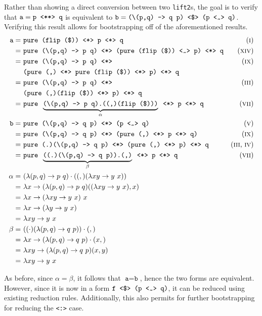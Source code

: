 Rather than showing a direct conversion between two \texttt{lift2}s, the goal is to verify that $\texttt{a} = \texttt{p \pa q}$ is equivalent to $\texttt{b} = \texttt{(\textbackslash (p,q) -> q p) \fmap (p \mult q)}$.
Verifying this result allows for bootstrapping off of the aforementioned results.
\begin{align*}
    \texttt{a} =\ & \texttt{pure (flip (\$)) \ap p \ap q} & \equi[1] \\
    =\ & \texttt{pure (\textbackslash (p,q) -> p q) \ap (pure (flip (\$)) \mult p) \ap q} & \equi[14] \\
    =\ & \texttt{pure (\textbackslash (p,q) -> p q) \ap} & \equi[9] \\
    & \texttt{(pure (,) \ap pure (flip (\$)) \ap p) \ap q}  \\
    =\ & \texttt{pure (\textbackslash (p,q) -> p q) \ap} & \equi[3] \\
    & \texttt{(pure (,)(flip (\$)) \ap p) \ap q} \\
    =\ & \texttt{pure }\underbrace{\texttt{(\textbackslash (p,q) -> p q).((,)(flip (\$)))}}_{\alpha}\texttt{ \ap p \ap q} & \equi[7] \\
    \texttt{b} =\ & \texttt{pure (\textbackslash (p,q) -> q p) \ap (p \mult q)} & \equi[5] \\
    =\ & \texttt{pure (\textbackslash (p,q) -> q p) \ap (pure (,) \ap p \ap q)} & \equi[9] \\
    =\ & \texttt{pure (.)(\textbackslash (p,q) -> q p) \ap (pure (,) \ap p) \ap q} & \text{({\sc\romannumeral 3}, {\sc\romannumeral 4})} \\
    =\ & \texttt{pure }\underbrace{\texttt{((.)(\textbackslash (p,q) -> q p)).(,)}}_{\beta}\texttt{ \ap p \ap q} & \equi[7] \\
    \alpha =\ & (\lambda (p, q) \to p\ q) \cdot ((,) (\lambda xy \to y\ x)) \\
    =\ & \lambda x \to (\lambda (p, q) \to p\ q) ((\lambda xy \to y\ x), x) \\
    =\ & \lambda x \to (\lambda xy \to y\ x)\ x \\
    =\ & \lambda x \to (\lambda y \to y\ x) \\
    =\ & \lambda xy \to y\ x \\
    \beta =\ &((\cdot) (\lambda (p, q) \to q\ p)) \cdot (,) \\
    =\ & \lambda x \to (\lambda (p, q) \to q\ p) \cdot (x, ) \\
    =\ & \lambda xy \to (\lambda (p, q) \to q\ p) (x, y) \\
    =\ & \lambda xy \to y\ x
\end{align*}

As before, since $\alpha = \beta$, it follows that $\texttt{a} = \texttt{b}$, hence the two forms are equivalent.
However, since it is now in a form $\texttt{f \fmap (p \mult q)}$, it can be reduced using existing reduction rules.
Additionally, this also permits for further bootstrapping for reducing the \texttt{<:>} case.
